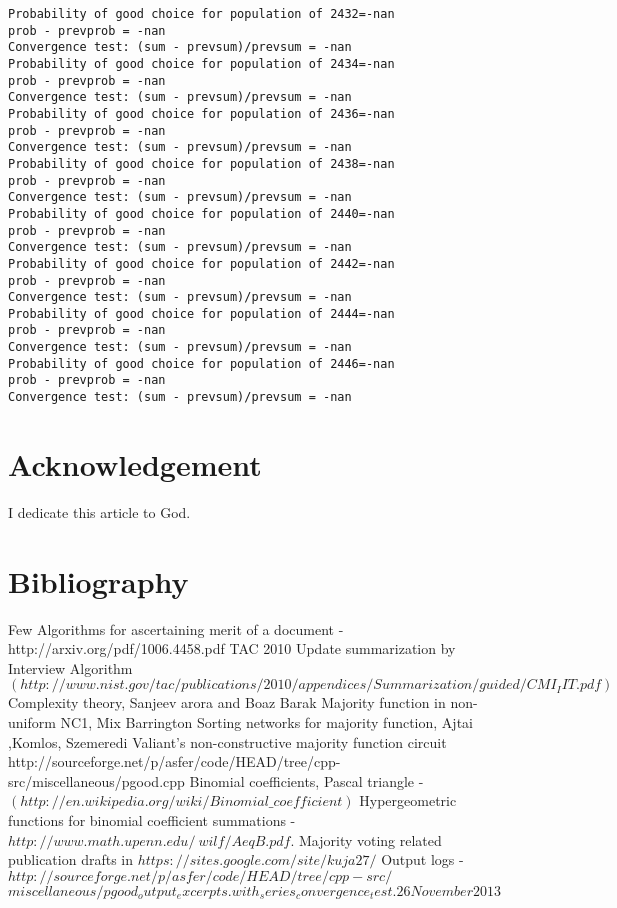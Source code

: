 \documentclass[11pt,onecolumn]{article}
\begin{document}
\begin{verbatim}
Probability of good choice for population of 2432=-nan
prob - prevprob = -nan
Convergence test: (sum - prevsum)/prevsum = -nan
Probability of good choice for population of 2434=-nan
prob - prevprob = -nan
Convergence test: (sum - prevsum)/prevsum = -nan
Probability of good choice for population of 2436=-nan
prob - prevprob = -nan
Convergence test: (sum - prevsum)/prevsum = -nan
Probability of good choice for population of 2438=-nan
prob - prevprob = -nan
Convergence test: (sum - prevsum)/prevsum = -nan
Probability of good choice for population of 2440=-nan
prob - prevprob = -nan
Convergence test: (sum - prevsum)/prevsum = -nan
Probability of good choice for population of 2442=-nan
prob - prevprob = -nan
Convergence test: (sum - prevsum)/prevsum = -nan
Probability of good choice for population of 2444=-nan
prob - prevprob = -nan
Convergence test: (sum - prevsum)/prevsum = -nan
Probability of good choice for population of 2446=-nan
prob - prevprob = -nan
Convergence test: (sum - prevsum)/prevsum = -nan
\end{verbatim}

\section{Acknowledgement}
I dedicate this article to God.

\section{Bibliography}
\begin{thebibliography}{99}
 Few Algorithms for ascertaining merit of a document - http://arxiv.org/pdf/1006.4458.pdf
 TAC 2010 Update summarization by Interview Algorithm $(http://www.nist.gov/tac/publications/2010/appendices/Summarization/guided/CMI_IIT.pdf)$
 Complexity theory, Sanjeev arora and Boaz Barak
 Majority function in non-uniform NC1, Mix Barrington
 Sorting networks for majority function, Ajtai ,Komlos, Szemeredi
 Valiant's non-constructive majority function circuit
 http://sourceforge.net/p/asfer/code/HEAD/tree/cpp-src/miscellaneous/pgood.cpp
 Binomial coefficients, Pascal triangle - $(http://en.wikipedia.org/wiki/Binomial\_coefficient)$ 
 Hypergeometric functions for binomial coefficient summations - $http://www.math.upenn.edu/~wilf/AeqB.pdf$. 
 Majority voting related publication drafts in $https://sites.google.com/site/kuja27/$
 Output logs - $http://sourceforge.net/p/asfer/code/HEAD/tree/cpp-src/$ \\
$miscellaneous/pgood_output_excerpts.with_series_convergence_test.26November2013$
\end{thebibliography}
\end{document}
